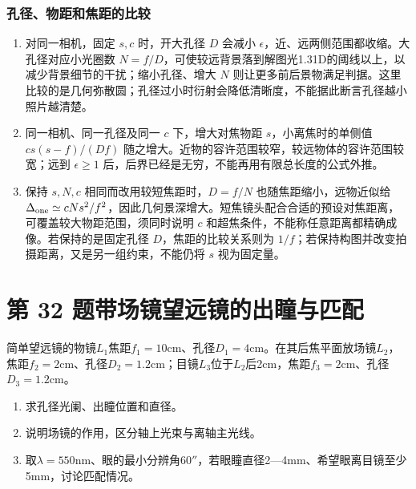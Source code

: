 \documentclass[UTF8,fontset=fandol,a4paper,11pt]{ctexart}
\begin{document}
\subsubsection*{孔径、物距和焦距的比较}
\begin{enumerate}
\item 对同一相机，固定 $s,c$ 时，开大孔径 $D$ 会减小 $\epsilon$，近、远两侧范围都收缩。大孔径对应小光圈数 $N=f/D$，可使较远背景落到解图光1.31D的阈线以上，以减少背景细节的干扰；缩小孔径、增大 $N$ 则让更多前后景物满足判据。这里比较的是几何弥散圆；孔径过小时衍射会降低清晰度，不能据此断言孔径越小照片越清楚。
\item 同一相机、同一孔径及同一 $c$ 下，增大对焦物距 $s$，小离焦时的单侧值 $cs(s-f)/(Df)$ 随之增大。近物的容许范围较窄，较远物体的容许范围较宽；远到 $\epsilon\ge1$ 后，后界已经是无穷，不能再用有限总长度的公式外推。
\item 保持 $s,N,c$ 相同而改用较短焦距时，$D=f/N$ 也随焦距缩小，远物近似给 $\Delta_{\rm one}\simeq cNs^2/f^2$，因此几何景深增大。短焦镜头配合合适的预设对焦距离，可覆盖较大物距范围，须同时说明 $c$ 和超焦条件，不能称任意距离都精确成像。若保持的是固定孔径 $D$，焦距的比较关系则为 $1/f$；若保持构图并改变拍摄距离，又是另一组约束，不能仍将 $s$ 视为固定量。
\end{enumerate}




\section*{第 32 题\quad 带场镜望远镜的出瞳与匹配}\label{q:32}

简单望远镜的物镜$L_1$焦距$f_1=10$cm、孔径$D_1=4$cm。在其后焦平面放场镜$L_2$，焦距$f_2=2$cm、孔径$D_2=1.2$cm；目镜$L_3$位于$L_2$后2cm，焦距$f_3=2$cm、孔径$D_3=1.2$cm。
\begin{enumerate}
\item 求孔径光阑、出瞳位置和直径。
\item 说明场镜的作用，区分轴上光束与离轴主光线。
\item 取$\lambda=550$nm、眼的最小分辨角$60''$，若眼瞳直径2—4mm、希望眼离目镜至少5mm，讨论匹配情况。
\end{enumerate}
\end{document}
